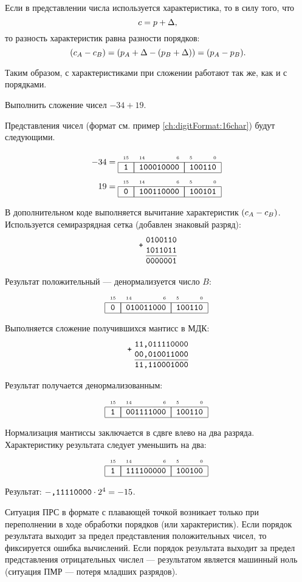 Если в представлении числа используется характеристика, то в силу того, что 
\[
    c = p + \Delta,
\]
то разность характеристик равна разности порядков:
\[
    (c_{A}-c_{B}) = (p_{A} + \Delta - (p_{B} + \Delta)) = (p_{A}-p_{B}).
\]

Таким образом, с характеристиками при сложении работают так же, как и с порядками.

\begin{Example}
    Выполнить сложение чисел $-34+19$.
\end{Example}
\begin{Solve}
    Представления чисел (формат см. пример \ref{ch:digitFormat:16char}) будут следующими. 
    
    \begin{align*}
        -34=\FloatMyCharHex{1}{100010000}{100110}\\
         19=\FloatMyCharHex{0}{100110000}{100101}
    \end{align*}
    
    В дополнительном коде выполняется вычитание характеристик $(c_{A}-c_{B})$. Используется семиразрядная сетка (добавлен знаковый разряд):
    \[
        \Addition{0100110}
                 {1011011}
                 {0000001}
    \]
    
    Результат положительный --- денормализуется число $B$:
    \[
        \FloatMyCharHex{0}{010011000}{100110}
    \]
    
    Выполняется сложение получившихся мантисс в МДК:
    \[
        \Addition{11,011110000}
                 {00,010011000}
                 {11,110001000}
    \]

    Результат получается денормализованным:
    \[
        \FloatMyCharHex{1}{001111000}{100110}
    \]
    
    Нормализация мантиссы заключается в сдвге влево на два разряда. Характеристику результата следует уменьшить на два:
    \[
        \FloatMyCharHex{1}{111100000}{100100}
    \]
    
    Результат: $-\texttt{,11110000}\cdot 2^{4} = -15$.
\end{Solve}

Ситуация ПРС в формате с плавающей точкой возникает только при переполнении в ходе обработки порядков (или характеристик). Если порядок результата выходит за предел представления положительных чисел, то фиксируется ошибка вычислений. Если порядок результата выходит за предел представления отрицательных числел --- результатом является машинный ноль (ситуация ПМР --- потеря младших разрядов).
